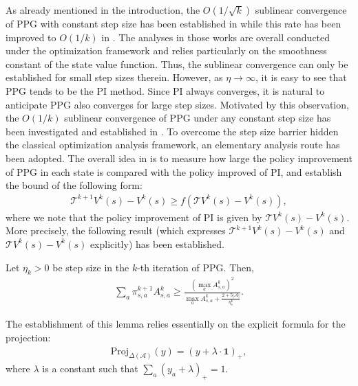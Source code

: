 As already mentioned in the introduction, the $O(1/\sqrt{k})$ sublinear convergence of PPG with constant step size has been
established in \cite{Agarwal_Kakade_Lee_Mahajan_2019,bhabdari2024or} while this  rate has been improved  to $O(1/k)$ in \cite{Xiao_2022,Zhang_Koppel_Bedi_Szepesvari_Wang_2020}. The analyses in those works are overall conducted under the optimization framework and relies particularly on the smoothness constant of the state value function. Thus, the sublinear convergence can only be established for small step sizes therein. However, as $\eta\rightarrow\infty$, it is easy to see that PPG tends to be the PI method. Since PI always converges, it is natural to anticipate PPG also converges for large step sizes.  Motivated by this observation, the $O(1/k)$ sublinear convergence of PPG under any constant step size  has been investigated and established in \cite{ppgliu}. To overcome the step size barrier hidden the classical optimization analysis framework, an elementary analysis route has been adopted. The overall idea in \cite{ppgliu} is to measure how large the policy improvement of PPG in each state is compared with the policy improved of PI, and establish the bound of the following form:
\begin{align*}
    \mathcal{T}^{k+1}V^k(s)-V^k(s)\geq f\left(\mathcal{T}V^k(s)-V^k(s)\right),
\end{align*}
where we note that the policy improvement of PI is given by $\mathcal{T}V^k(s)-V^k(s)$. More precisely, the following result (which expresses $\mathcal{T}^{k+1}V^k(s)-V^k(s)$ and $\mathcal{T}V^k(s)-V^k(s)$ explicitly) has been established.
\begin{lemma}\label{lem:ppg-improvement}
Let $\eta_k>0$ be step size in the $k$-th iteration of PPG. Then,
\begin{align*}
\sum_a\pi^{k+1}_{s,a}A^k_{s,a}\geq \frac{\left(\max_a A^k_{s,a}\right)^2}{\max_a A^k_{s,a}+\frac{2+5|\mathcal{A}|}{\eta_s^k}}.
\end{align*}
\end{lemma}
\noindent The establishment of this lemma relies essentially on the explicit formula for the projection:
\begin{align*}
    \mathrm{Proj}_{\Delta(\mathcal{A})}(y) = (y+\lambda\cdot \bm{1})_+,
\end{align*}
where $\lambda$ is a constant such that $\sum_a(y_a+\lambda)_+=1.$ 

